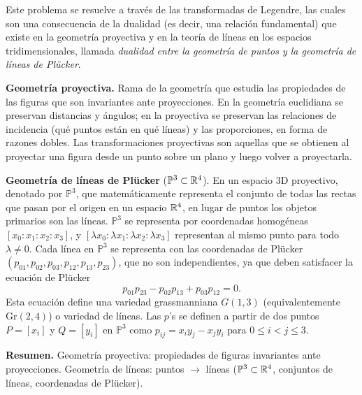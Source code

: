 Este problema se resuelve a través de las transformadas de Legendre, las cuales son una consecuencia
de la dualidad (es decir, una relación fundamental) que existe en la geometría proyectiva y en la
teoría de líneas en los espacios tridimensionales, llamada \emph{dualidad entre la geometría de puntos
y la geometría de líneas de Plücker}.

\begin{observacion}
  \textbf{Geometría proyectiva.} Rama de la geometría que estudia las propiedades de las figuras que
  son invariantes ante proyecciones. En la geometría euclidiana se preservan distancias y ángulos;
  en la proyectiva se preservan las relaciones de incidencia (qué puntos están en qué líneas) y las
  proporciones, en forma de razones dobles. Las transformaciones proyectivas son aquellas que se
  obtienen al proyectar una figura desde un punto sobre un plano y luego volver a proyectarla.

  \textbf{Geometría de líneas de Plücker} ($\mathbb{P}^{3}\subset\mathbb{R}^{4}$). En un espacio $3$D proyectivo,
  denotado por $\mathbb{P}^{3}$, que matemáticamente representa el conjunto de todas las rectas que
  pasan por el origen en un espacio $\mathbb{R}^{4}$, en lugar de puntos los objetos primarios son las líneas.
  $\mathbb{P}^{3}$ se representa por coordenadas homogéneas $[x_0:x_1:x_2:x_3]$, y
  $[\lambda x_0:\lambda x_1:\lambda x_2:\lambda x_3]$ representan al mismo punto para todo
  $\lambda\neq0$. Cada línea en $\mathbb{P}^{3}$ se representa con las coordenadas de Plücker
  $(p_{01},p_{02},p_{03},p_{12},p_{13},p_{23})$, que no son independientes, ya que deben satisfacer
  la ecuación de Plücker
  \begin{equation*}
    p_{01}p_{23}-p_{02}p_{13}+p_{03}p_{12}=0.
  \end{equation*}
  Esta ecuación define una variedad grassmanniana $G(1,3)$ (equivalentemente $\mathrm{Gr}(2,4)$) o
  variedad de líneas. Las $p$'s se definen a partir de dos puntos $P=[x_i]$ y $Q=[y_i]$ en
  $\mathbb{P}^{3}$ como $p_{ij}=x_iy_j-x_jy_i$ para $0\leq i<j\leq3$.

  \textbf{Resumen.} Geometría proyectiva: propiedades de figuras invariantes ante proyecciones.
  Geometría de líneas: puntos $\to$ líneas ($\mathbb{P}^{3}\subset\mathbb{R}^{4}$, conjuntos de líneas,
  coordenadas de Plücker).
\end{observacion}

